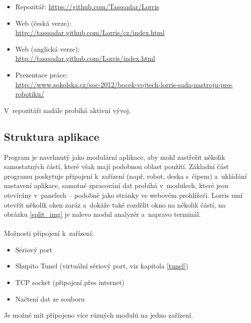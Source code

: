 \documentclass[12pt, a4paper, oneside]{article}
\begin{document}
\begin{itemize}
    \item Repozitář: \url{https://github.com/Tasssadar/Lorris}
    \item Web (česká verze):\\ \url{http://tasssadar.github.com/Lorris/cz/index.html}
    \item Web (anglická verze):\\ \url{http://tasssadar.github.com/Lorris/index.html}
    \item Prezentace práce: \\ \url{http://www.sokolska.cz/soc-2012/bocek-vojtech-lorris-sada-nastroju-pro-robotiku/}
\end{itemize}
V~repozitáři nadále probíhá aktivní vývoj.


\subsection{Struktura aplikace}
Program je navrhnutý jako modulární aplikace, aby mohl zastřešit několik samostatných částí, které však mají podobnou oblast použití. Základní část programu poskytuje připojení k~zařízení (např. robot, deska s~čipem) a~ukládání nastavení aplikace, samotné zpracování dat probíhá v~modulech, které jsou otevírány v~panelech -- podobně jako stránky ve webovém prohlížeči. Lorris umí otevřít několik oken zaráz a~dokáže také rozdělit okno na několik částí, na obrázku \ref{split_img} je nalevo modul analyzér a~napravo terminál. \\
\\
\noindent Možnosti připojení k~zařízení:
\begin{itemize}
    \item Sériový port
    \item Shupito Tunel (virtuální sériový port, viz kapitola \ref{tunel})
    \item TCP socket (připojení přes internet)
    \item Načtení dat ze souboru
\end{itemize}
Je možné mít připojeno více různých modulů na jedno zařízení.
\end{document}
